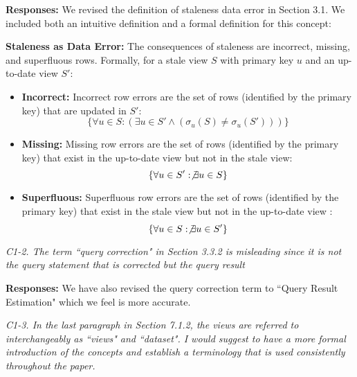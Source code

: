 \vspace{.25em}

{\bf Responses:} We revised the definition of staleness data error in Section 3.1. We included both an intuitive definition and a formal definition for this concept:
\begin{displayquote} 
\noindent \textbf{Staleness as Data Error: } The consequences of staleness are incorrect, missing, and superfluous rows. 
Formally, for a stale view $S$ with primary key $u$ and an up-to-date view $S'$:

\vspace{-.5em}

\begin{itemize}[noitemsep] \sloppy
	\item \textbf{Incorrect: } Incorrect row errors are the set of rows (identified by the primary key) that are updated in $S'$: \[\{\forall u \in S : (\exists u \in S' \wedge (\sigma_u(S) \ne \sigma_u(S')))\}\]
	\item \textbf{Missing: } Missing row errors are the set of rows (identified by the primary key) that exist in the up-to-date view but not in the stale view: \[\{\forall u \in S' : \not \exists u \in S\}\]
	\item \textbf{Superfluous: } Superfluous row errors are the set of rows (identified by the primary key) that exist in the stale view but not in the up-to-date view : \[\{ \forall u \in S : \not\exists u \in S' \}\]
\end{itemize}

\vspace{-.5em}

\end{displayquote} 

\vspace{1em}
\emph{C1-2. The term ``query correction" in Section 3.3.2 is misleading since it is not the query statement that is corrected but the query result}

\vspace{.25em}

{\bf Responses:} We have also revised the query correction term to ``Query Result Estimation" which we feel is more accurate.

\vspace{1em}
\emph{C1-3. In the last paragraph in Section 7.1.2, the views are referred to interchangeably as ``views" and ``dataset". I would suggest to have a more formal introduction of the concepts and establish a terminology that is used consistently throughout the paper.}

